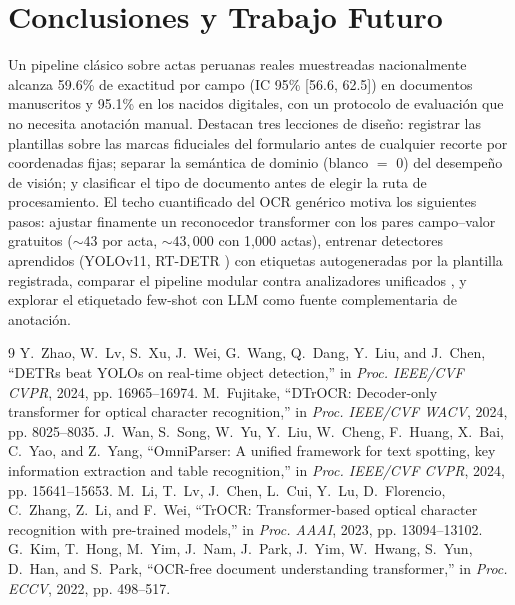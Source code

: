 \documentclass[conference]{IEEEtran}
\begin{document}
\section{Conclusiones y Trabajo Futuro}
Un pipeline cl\'asico sobre actas peruanas reales muestreadas nacionalmente
alcanza 59.6\% de exactitud por campo (IC 95\% [56.6, 62.5]) en documentos
manuscritos y 95.1\% en los nacidos digitales, con un protocolo de
evaluaci\'on que no necesita anotaci\'on manual. Destacan tres lecciones de
dise\~no: registrar las plantillas sobre las marcas fiduciales del formulario
antes de cualquier recorte por coordenadas fijas; separar la sem\'antica de
dominio (blanco $=$ 0) del desempe\~no de visi\'on; y clasificar el tipo de
documento antes de elegir la ruta de procesamiento. El techo cuantificado del
OCR gen\'erico motiva los siguientes pasos: ajustar finamente un reconocedor
transformer \cite{trocr,dtrocr} con los pares campo--valor gratuitos
(${\sim}43$ por acta, ${\sim}43{,}000$ con 1,000 actas), entrenar detectores
aprendidos (YOLOv11, RT-DETR \cite{rtdetr}) con etiquetas autogeneradas por
la plantilla registrada, comparar el pipeline modular contra analizadores
unificados \cite{omniparser,donut}, y explorar el etiquetado few-shot con
LLM como fuente complementaria de anotaci\'on.

\begin{thebibliography}{9}
 Y.~Zhao, W.~Lv, S.~Xu, J.~Wei, G.~Wang, Q.~Dang, Y.~Liu,
and J.~Chen, ``DETRs beat YOLOs on real-time object detection,'' in
\emph{Proc. IEEE/CVF CVPR}, 2024, pp. 16965--16974.
 M.~Fujitake, ``DTrOCR: Decoder-only transformer for optical
character recognition,'' in \emph{Proc. IEEE/CVF WACV}, 2024, pp. 8025--8035.
 J.~Wan, S.~Song, W.~Yu, Y.~Liu, W.~Cheng, F.~Huang,
X.~Bai, C.~Yao, and Z.~Yang, ``OmniParser: A unified framework for text
spotting, key information extraction and table recognition,'' in \emph{Proc.
IEEE/CVF CVPR}, 2024, pp. 15641--15653.
 M.~Li, T.~Lv, J.~Chen, L.~Cui, Y.~Lu, D.~Florencio, C.~Zhang,
Z.~Li, and F.~Wei, ``TrOCR: Transformer-based optical character recognition
with pre-trained models,'' in \emph{Proc. AAAI}, 2023, pp. 13094--13102.
 G.~Kim, T.~Hong, M.~Yim, J.~Nam, J.~Park, J.~Yim, W.~Hwang,
S.~Yun, D.~Han, and S.~Park, ``OCR-free document understanding transformer,''
in \emph{Proc. ECCV}, 2022, pp. 498--517.
\end{thebibliography}
\end{document}
